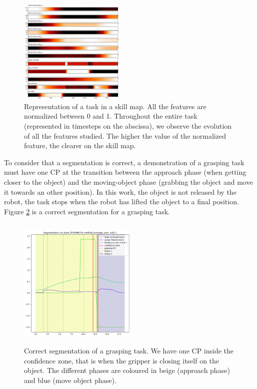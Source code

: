 \documentclass[conference]{IEEEtran}
\begin{document}
 \begin{figure}[ht]
  \centering
  \includegraphics[width=0.45\textwidth]{img/skillMap.png}
  \caption{Representation of a task in a skill map. All the features are normalized between 0 and 1. Throughout the entire task (represented in timesteps on the abscissa), we observe the evolution of all the features studied. The higher the value of the normalized feature, the clearer on the skill map.}
  \label{fig:skillmap}
\end{figure}

To consider that a segmentation is correct, a demonstration of a grasping task must have one CP at the transition between the approach phase (when getting closer to the object) and the moving-object phase (grabbing the object and move it towards an other position). In this work, the object is not released by the robot, the task stops when the robot has lifted the object to a final position. Figure \ref{fig:coloredseg} is a correct segmentation for a grasping task.

\begin{figure}[ht]
  \centering
  \includegraphics[width=0.5\textwidth,height=2.5in]{img/resolSeg.png}
  \caption{Correct segmentation of a grasping task. We have one CP inside the confidence zone, that is when the gripper is closing itself on the object. The different phases are coloured in beige (approach phase) and blue (move object phase).}
  \label{fig:coloredseg}
\end{figure}
\end{document}
